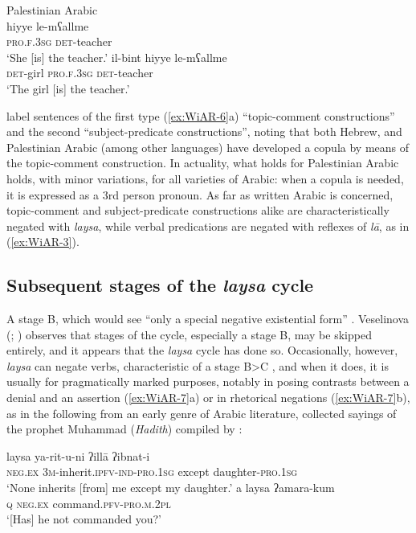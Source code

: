\documentclass[output=paper]{langsci/langscibook}
\begin{document}
\ea Palestinian Arabic \citep[431]{li1977a}\label{ex:WiAR-6}\\
  \ea
  	\gll hiyye le-mʕallme\\
  	\textsc{pro.f.3sg} \textsc{det}-teacher\\
  	\glt‘She [is] the teacher.’
  \ex
  	\gll il-bint hiyye le-mʕallme\\
  	\textsc{det}-girl \textsc{pro.f.3sg} \textsc{det}-teacher\\
  	\glt ‘The girl [is] the teacher.’
\z \z

\citet[420]{li1977a} label sentences of the first type (\ref{ex:WiAR-6}a) “topic-comment constructions” and the second “subject-predicate constructions”, noting that both Hebrew, and Palestinian Arabic (among other languages) have developed a copula by means of the topic-comment construction. In actuality, what holds for Palestinian Arabic holds, with minor variations, for all varieties of Arabic: when a copula is needed, it is expressed as a 3rd person pronoun. As far as written Arabic is concerned, topic-comment and subject-predicate constructions alike are characteristically negated with \textit{laysa}, while verbal predications are negated with reflexes of \textit{lā}, as in (\ref{ex:WiAR-3}). 

\subsection{Subsequent stages of the \textit{laysa} cycle} \label{s:WiAR-2.3}

A stage B, which would see “only a special negative existential form” \citep[9]{Croft1991}. Veselinova (\citeyear[1338]{Veselinova2014}; \citeyear[153]{Veselinova2016}) observes that stages of the cycle, especially a stage B, may be skipped entirely, and it appears that the \textit{laysa} cycle has done so. Occasionally, however, \textit{laysa} can negate verbs, characteristic of a stage B>C \citep[9-10]{Croft1991}, and when it does, it is usually for pragmatically marked purposes, notably in posing contrasts between a denial and an assertion (\ref{ex:WiAR-7}a) or in rhetorical negations (\ref{ex:WiAR-7}b), as in the following from an early genre of Arabic literature, collected sayings of the prophet Muhammad (\textit{Hadith}) compiled by \citet[d. 870]{al-bu2000a}:

\ea \label{ex:WiAR-7}
  \ea
  	\gll laysa ya-rit-u-ni ʔillā ʔibnat-i\\
  	\textsc{neg.ex} \textsc{3m}-inherit.\textsc{ipfv-ind-pro.1sg} except daughter-\textsc{pro.1sg}\\
  	\glt ‘None inherits [from] me except my daughter.’ \citep[Vol. VIII p. 151]{al-bu2000a}
  \ex
  	\gll a laysa ʔamara-kum\\
  	\textsc{q} \textsc{neg.ex} command.\textsc{pfv-pro.m.2pl}\\
  	\glt ‘[Has] he not commanded you?’ \citep[Vol. VI p. 864]{al-bu2000a}
\z \z
\end{document}
